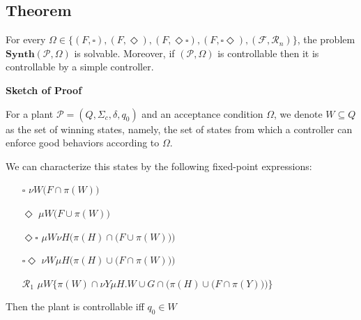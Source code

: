 \documentclass[table]{beamer}
\newcommand{\Plant}{\ensuremath{\mathcal{P}=(Q,\Sigma_c,\delta, q_0)}}
\newcommand{\AccpCond}{\ensuremath{\{(F,\square),(F,\Diamond ),(F,\Diamond\square),(F,\square\Diamond),(\mathcal{F},\mathcal{R}_n)\}}}
\newcommand{\Synth}{\ensuremath{\textbf{Synth}(\mathcal{P},\Omega)}}
\begin{document}
\subsection{Theorem}
\begin{frame}
	\begin{thm}
		For every $\Omega \in \AccpCond$, the problem $\Synth$ is solvable. 
		Moreover, if $(\mathcal{P},\Omega)$ is controllable then 
		it is controllable by a simple controller.
	\end{thm}
	\textbf{Sketch of Proof}

	\medskip
	
	For a plant $\Plant$ and an acceptance condition $\Omega$, we denote $W \subseteq Q$ as the set
	of winning states, namely, the set of states from which a controller can enforce good behaviors according to $\Omega$.
\end{frame}

\begin{frame}
	We can characterize this states by the following fixed-point expressions:
	\begin{itemize}
		\item[$\square$] $\nu W \big( F \cap \pi(W)\big)$ 
		\item[$\Diamond$] $\mu W\big(F \cup \pi(W)\big)$ 
		\item[$\Diamond\square$] $\mu W \nu H\Big(\pi(H) \cap \big(F \cup \pi(W)\big)\Big)$
		\item[$\square\Diamond$] $\nu W \mu H\Big(\pi(H) \cup \big(F \cap \pi(W)\big)\Big)$
		\item[$\mathcal{R}_1$] $\mu W \Bigg\{\pi(W) \cap \nu Y \mu H . W \cup G \cap \Big(\pi(H) \cup \big(F \cap \pi(Y)\big)\Big)\Bigg\}$
	\end{itemize}
	Then the plant is controllable iff $q_0 \in W$
\end{frame}
\end{document}
